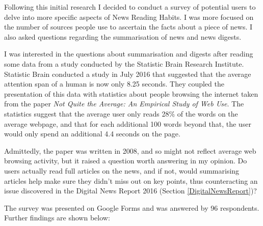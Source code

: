 \documentclass[12pt]{article}
\begin{document}
\label{survey}

Following this initial research I decided to conduct a survey of potential users to delve into more specific aspects of News Reading Habits. I was more focused on the number of sources people use to ascertain the facts about a piece of news. I also asked questions regarding the summarisation of news and news digests.

I was interested in the questions about summarisation and digests after reading some data from a study conducted by the Statistic Brain Research Institute\cite{statisticBrain}. Statistic Brain conducted a study in July 2016 that suggested that the average attention span of a human is now only 8.25 seconds\cite{attentionSpan}. They coupled the presentation of this data with statistics about people browsing the internet taken from the paper \emph{Not Quite the Average:
An Empirical Study of Web Use}\cite{empiricalStudyofWebUse}. The statistics suggest that the average user only reads 28\% of the words on the average webpage, and that for each additional 100 words beyond that, the user would only spend an additional 4.4 seconds on the page.

Admittedly, the paper was written in 2008, and so might not reflect average web browsing activity, but it raised a question worth answering in my opinion. Do users actually read full articles on the news, and if not, would summarising articles help make sure they didn't miss out on key points, thus counteracting an issue discovered in the Digital News Report 2016\cite{digitalNewsReport} (Section \ref{DigitalNewsReport})? 

The survey was presented on Google Forms\cite{googleForms} and was answered by 96 respondents. Further findings are shown below:
\end{document}

